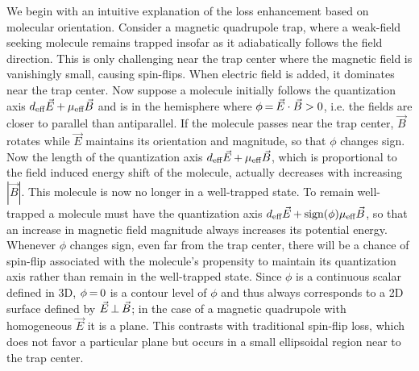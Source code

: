 \documentclass[%
 reprint,
 amsmath,amssymb,
 aps,
prl,
]{revtex4-1}
\newcommand{\epb}{{$\vec{E}\s {\perp}\s\vec{B}$}}
\newcommand{\s}{{\nobreak\hspace{.2em}}}
\begin{document}

We begin with an intuitive explanation of the loss enhancement based on molecular orientation.
Consider a magnetic quadrupole trap, where a weak-field seeking molecule remains trapped insofar as it adiabatically follows the field direction. 
This is only challenging near the trap center where the magnetic field is vanishingly small, causing spin-flips. 
When electric field is added, it dominates near the trap center. %
Now suppose a molecule initially follows the quantization axis $d_\text{eff}\vec{E}\s {+}\s\mu_\text{eff}\vec{B}$ and is in the hemisphere where $\phi\s {=}\s\vec{E}\cdot\vec{B}>0$, i.e. the fields are closer to parallel than antiparallel.
If the molecule passes near the trap center, $\vec{B}$ rotates while $\vec{E}$ maintains its orientation and magnitude, so that $\phi$ changes sign.
Now the length of the quantization axis $d_\text{eff}\vec{E}\s {+}\s\mu_\text{eff}\vec{B}$, which is proportional to the field induced energy shift of the molecule, actually decreases with increasing $|\vec{B}|$.
This molecule is now no longer in a well-trapped state.
To remain well-trapped a molecule must have the quantization axis $d_\text{eff}\vec{E}\s {+}\s\text{sign}(\phi)\mu_\text{eff}\vec{B}$, so that an increase in magnetic field magnitude always increases its potential energy.
Whenever $\phi$ changes sign, even far from the trap center, there will be a chance of spin-flip associated with the molecule's propensity to maintain its quantization axis rather than remain in the well-trapped state.
Since $\phi$ is a continuous scalar defined in 3D, $\phi\s {=}\s 0$ is a contour level of $\phi$ and thus always corresponds to a 2D surface defined by \epb{}; in the case of a magnetic quadrupole with homogeneous $\vec{E}$ it is a plane.
This contrasts with traditional spin-flip loss, which does not favor a particular plane but occurs in a small ellipsoidal region near to the trap center.
\end{document}
